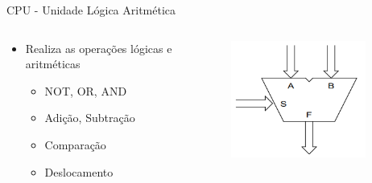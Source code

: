 \documentclass[aspectratio=169,
				xcolor=table]{beamer}
\begin{document}
		\begin{frame}{CPU - Unidade Lógica Aritmética}
			\begin{columns}
				\begin{column}{0.6\textwidth}
					\begin{itemize}
						\item Realiza as operações lógicas e aritméticas
						\begin{itemize}
							\item NOT, OR, AND
							\item Adição, Subtração
							\item Comparação
							\item Deslocamento
						\end{itemize}				
					\end{itemize}				
				\end{column}
				\begin{column}{0.4\textwidth}
				
					\begin{figure}
					\centering
						\includegraphics[width=0.9\textwidth, keepaspectratio]{../figs/cap04/ula} 
					\end{figure}
				\end{column}
			\end{columns}

			\begin{flushright}
				\begin{minipage}{0.7\textwidth}
					\vspace{-4em}
				\end{minipage}
			\end{flushright}

		\end{frame}
		
\end{document}
